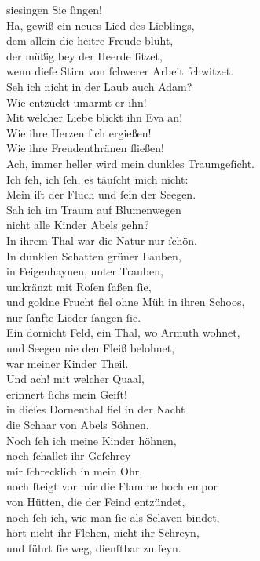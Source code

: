 \documentclass[tocstyle=ref-genre]{ees}
\begin{document}
{\begin{movement}{siesingen}
  \voice[Kain]
  Sie ſingen!\\
  Ha, gewiß ein neues Lied des Lieblings,\\
  dem allein die heitre Freude blüht,\\
  der müßig bey der Heerde ſitzet,\\
  wenn dieſe Stirn von ſchwerer Arbeit ſchwitzet.\\
  Seh ich nicht in der Laub auch Adam?\\
  Wie entzückt umarmt er ihn!\\
  Mit welcher Liebe blickt ihn Eva an!\\
  Wie ihre Herzen ſich ergießen!\\
  Wie ihre Freudenthränen fließen!\\
  Ach, immer heller wird mein dunkles Traumgeſicht.\\
  Ich ſeh, ich ſeh, es täuſcht mich nicht:\\
  Mein iſt der Fluch und ſein der Seegen.\\
  Sah ich im Traum auf Blumenwegen\\
  nicht alle Kinder Abels gehn?\\
  In ihrem Thal war die Natur nur ſchön.\\
  In dunklen Schatten grüner Lauben,\\
  in Feigenhaynen, unter Trauben,\\
  umkränzt mit Roſen ſaßen ſie,\\
  und goldne Frucht fiel ohne Müh in ihren Schoos,\\
  nur ſanfte Lieder ſangen ſie.\\
  Ein dornicht Feld, ein Thal, wo Armuth wohnet,\\
  und Seegen nie den Fleiß belohnet,\\
  war meiner Kinder Theil.\\
  Und ach! mit welcher Quaal,\\
  erinnert ſichs mein Geiſt!\\
  in dieſes Dornenthal fiel in der Nacht\\
  die Schaar von Abels Söhnen.\\
  Noch ſeh ich meine Kinder höhnen,\\
  noch ſchallet ihr Geſchrey\\
  mir ſchrecklich in mein Ohr,\\
  noch ſteigt vor mir die Flamme hoch empor\\
  von Hütten, die der Feind entzündet,\\
  noch ſeh ich, wie man ſie als Sclaven bindet,\\
  hört nicht ihr Flehen, nicht ihr Schreyn,\\
  und führt ſie weg, dienſtbar zu ſeyn.
\end{movement}

}
\end{document}
